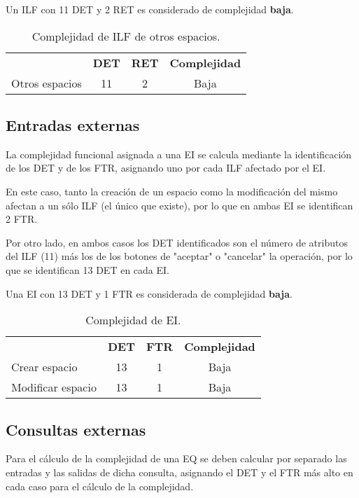 \par Un ILF con 11 DET y 2 RET es considerado de complejidad \textbf{baja}.

\begin{table}[h]
\begin{center}
\begin{tabular}{ l c c c }
& \textbf{DET} & \textbf{RET} & \textbf{Complejidad} \\
Otros espacios & 11 & 2 & Baja\\
\end{tabular}
\caption{Complejidad de ILF de otros espacios.}
\label{tab:compILF}
\end{center}
\end{table}

\subsection{Entradas externas}
\par La complejidad funcional asignada a una EI se calcula mediante la identificación de los DET y de los FTR, asignando uno por cada ILF afectado por el EI.

\par En este caso, tanto la creación de un espacio como la modificación del mismo afectan a un sólo ILF (el único que existe), por lo que en ambas EI se identifican 2 FTR.

\par Por otro lado, en ambos casos los DET identificados son el número de atributos del ILF (11) más los de los botones de "aceptar" o "cancelar" la operación, por lo que se identifican 13 DET en cada EI.

\par Una EI con 13 DET y 1 FTR es considerada de complejidad \textbf{baja}.

\begin{table}[h]
\begin{center}
\begin{tabular}{ l c c c }
& \textbf{DET} & \textbf{FTR} & \textbf{Complejidad} \\
Crear espacio & 13 & 1 & Baja\\
Modificar espacio & 13 & 1 & Baja\\
\end{tabular}
\caption{Complejidad de EI.}
\label{tab:compEI}
\end{center}
\end{table}

\subsection{Consultas externas}
\par Para el cálculo de la complejidad de una EQ se deben calcular por separado las entradas y las salidas de dicha consulta, asignando el DET y el FTR más alto en cada caso para el cálculo de la complejidad.

